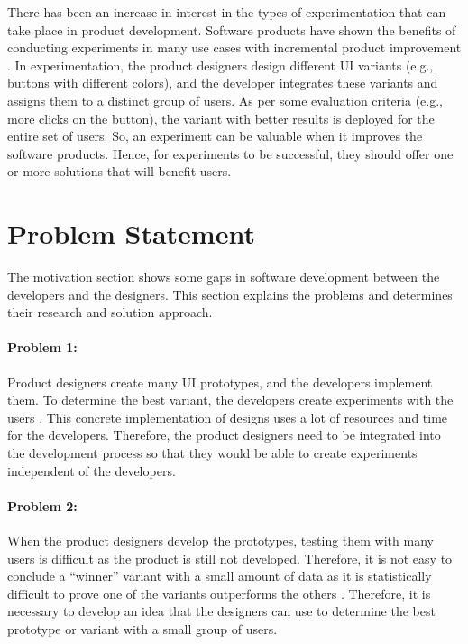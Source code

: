 There has been an increase in interest in the types of experimentation that can take place in product development. 
Software products have shown the benefits of conducting experiments in many use cases with incremental product improvement \cite{article:controlled:experiements}.
In experimentation, the product designers design different UI variants (e.g., buttons with different colors), and the developer integrates these variants and assigns them to a distinct group of users. 
As per some evaluation criteria (e.g., more clicks on the button), the variant with better results is deployed for the entire set of users.
So, an experiment can be valuable when it improves the software products.
Hence, for experiments to be successful, they should offer one or more solutions that will benefit users.

\section{Problem Statement}
\label{intro:section:problems}
The motivation section shows some gaps in software development between the developers and the designers.
This section explains the problems and determines their research and solution approach.

\paragraph{Problem 1:} Product designers create many UI prototypes, and the developers implement them.
To determine the best variant, the developers create experiments with the users \cite{article:experiments:lindgren}. 
This concrete implementation of designs uses a lot of resources and time for the developers.
Therefore, the product designers need to be integrated into the development process so that they would be able to create experiments independent of the developers.


\paragraph{Problem 2:} When the product designers develop the prototypes, testing them with many users is difficult as the product is still not developed.
Therefore, it is not easy to conclude a ``winner'' variant with a small amount of data as it is statistically difficult to prove one of the variants outperforms the others \cite{article:usability:smalldata}.
Therefore, it is necessary to develop an idea that the designers can use to determine the best prototype or variant with a small group of users.

